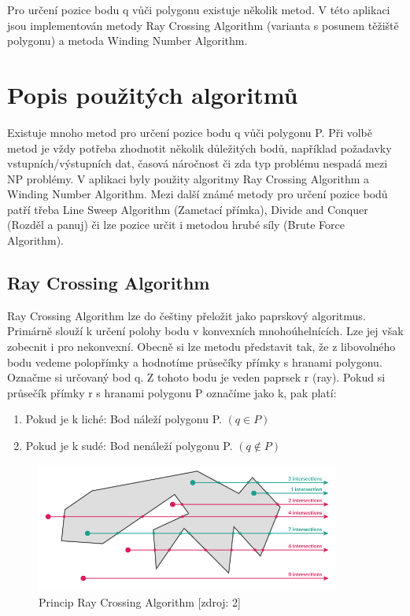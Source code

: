 \documentclass[a4paper, 12pt]{article}
\begin{document}
Pro určení pozice bodu q vůči polygonu existuje několik metod. V této aplikaci jsou implementován metody Ray Crossing Algorithm (varianta s posunem těžiště polygonu) a metoda Winding Number Algorithm.

\section{Popis použitých algoritmů}
Existuje mnoho metod pro určení pozice bodu q vůči polygonu P. Při volbě metod je vždy potřeba zhodnotit několik důležitých bodů, například požadavky vstupních/výstupních dat, časová náročnost či zda typ problému nespadá mezi NP problémy. V aplikaci byly použity algoritmy Ray Crossing Algorithm a Winding Number Algorithm. Mezi další známé metody pro určení pozice bodů patří třeba Line Sweep Algorithm (Zametací přímka), Divide and Conquer (Rozděl a panuj) či lze pozice určit i metodou hrubé síly (Brute Force Algorithm).

\subsection{Ray Crossing Algorithm}
Ray Crossing Algorithm lze do češtiny přeložit jako paprskový algoritmus. Primárně slouží k určení polohy bodu v konvexních mnohoúhelnících. Lze jej však zobecnit i pro nekonvexní. Obecně si lze metodu představit tak, že z libovolného bodu vedeme polopřímky a hodnotíme průsečíky přímky s hranami polygonu. \\

Označme si určovaný bod q. Z tohoto bodu je veden paprsek r (ray). Pokud si průsečík přímky r s hranami polygonu P označíme jako k, pak platí:
\begin{enumerate}
\item Pokud je k liché: Bod náleží polygonu P. $(q\in P)$ 
\item Pokud je k sudé: Bod nenáleží polygonu P.  $(q {\not \in} P)$ 
\end{enumerate}

\begin{figure}[h]
	\centering
	\includegraphics[width=10cm]{ray.png}
	\caption{Princip Ray Crossing Algorithm [zdroj: 2]}
\end{figure}
\end{document}
